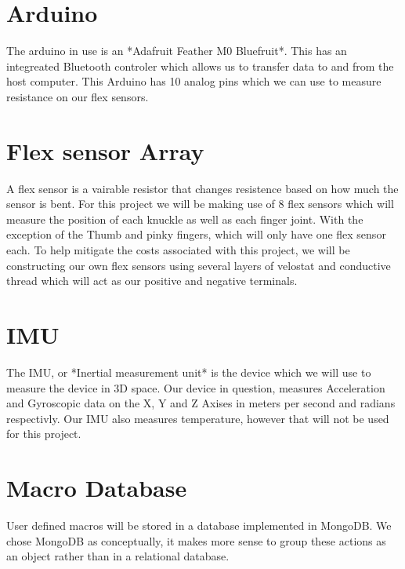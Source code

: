 \documentclass[12pt,a4paper,oneside]{book}
\theoremstyle{plain}
\numberwithin{equation}{chapter}
\begin{document}
\section{Arduino}

\noindent The arduino in use is an *Adafruit Feather M0 Bluefruit*. This has an integreated Bluetooth controler which allows us to transfer data to and from the host computer. This Arduino has 10 analog pins which we can use to measure resistance on our flex sensors.

\section{Flex sensor Array}

\noindent A flex sensor is a vairable resistor that changes resistence based on how much the sensor is bent. For this project we will be making use of 8 flex sensors which will measure the position of each knuckle as well as each finger joint. With the exception of the Thumb and pinky fingers, which will only have one flex sensor each. To help mitigate the costs associated with this project, we will be constructing our own flex sensors using several layers of velostat and conductive thread which will act as our positive and negative terminals.

\section{IMU}

\noindent The IMU, or *Inertial measurement unit* is the device which we will use to measure the device in 3D space. Our device in question, measures Acceleration and Gyroscopic data on the X, Y and Z Axises in meters per second and radians respectivly. Our IMU also measures temperature, however that will not be used for this project.

\section{Macro Database}

\noindent User defined macros will be stored in a database implemented in MongoDB. We chose MongoDB as conceptually, it makes more sense to group these actions as an object rather than in a relational database.
\end{document}

